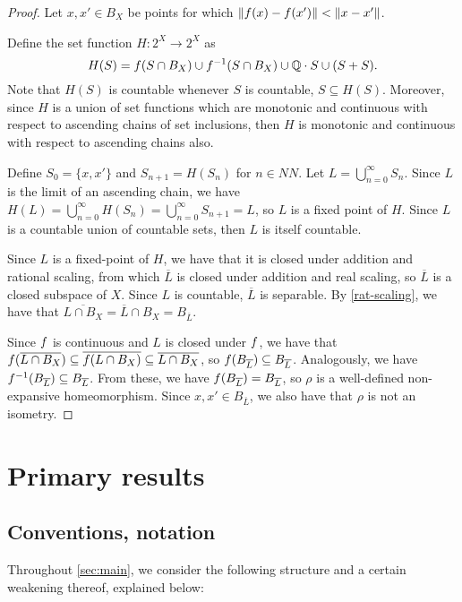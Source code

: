 \documentclass{amsart}
\theoremstyle{definition}
\newcommand{\clo}[1]{\overline{#1}}
\begin{document}
\begin{proof}
    Let $x, x' \in B_X$ be points for which $\norm{f(x)-f(x')} < \norm{x-x'}$.

    Define the set function $H : 2^X \to 2^X$ as \[ H(S) = f(S \cap B_X) \cup f^{-1}(S \cap B_X) \cup \mathbb{Q} \cdot S \cup (S+S). \] Note that $H(S)$ is countable whenever $S$ is countable, $S \subseteq H(S)$. Moreover, since $H$ is a union of set functions which are monotonic and continuous with respect to ascending chains of set inclusions, then $H$ is monotonic and continuous with respect to ascending chains also.
  
    Define $S_0 = \{x,x'\}$ and $S_{n+1} = H(S_n)$ for $n \in NN$. Let $L = \bigcup_{n=0}^\infty S_n.$ Since $L$ is the limit of an ascending chain, we have $H(L) = \bigcup_{n=0}^\infty H(S_n) = \bigcup_{n=0}^\infty S_{n+1} = L$, so $L$ is a fixed point of $H$. Since $L$ is a countable union of countable sets, then $L$ is itself countable.
  
    Since $L$ is a fixed-point of $H$, we have that it is closed under addition and rational scaling, from which $\clo{L}$ is closed under addition and real scaling, so $\clo{L}$ is a closed subspace of $X$.
    Since $L$ is countable, $\clo{L}$ is separable. By \autoref{rat-scaling},
    we have that $\clo{L \cap B_X} = \clo{L} \cap B_X = B_{\clo{L}}$.
  
    Since $f$ is continuous and $L$ is closed under $f$, we have
    that $\lip(\clo{L \cap B_X}) \subseteq \clo{\lip(L \cap B_X)} \subseteq \clo{L \cap B_X}$, so $\lip(B_{\clo{L}}) \subseteq B_{\clo{L}}$. Analogously, we have $\lip^{-1}(B_{\clo{L}}) \subseteq B_{\clo{L}}$. From these, we have $\lip(B_{\clo{L}}) = B_{\clo{L}}$, so $\rho$ is a well-defined non-expansive homeomorphism. Since $x, x' \in B_{\clo{L}}$, we also have that $\rho$ is not an isometry.
\end{proof}

\section{Primary results} \label{sec:main}

\subsection{Conventions, notation} \label{sec:main_notation}

Throughout \autoref{sec:main}, we consider the following structure
and a certain weakening thereof, explained below:
\end{document}

